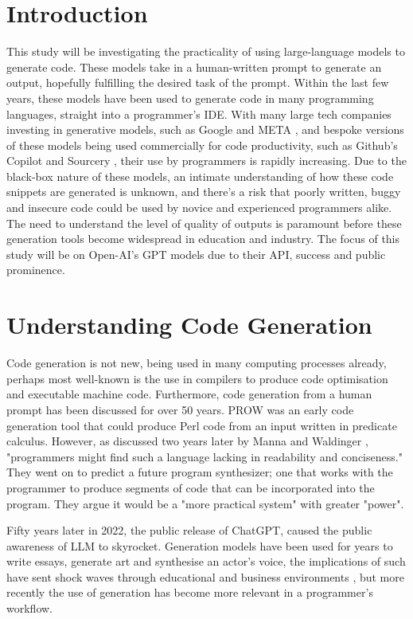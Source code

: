\documentclass[manuscript,screen,review,sigconf]{acmart}
\begin{document}
\section{Introduction}
This study will be investigating the practicality of using large-language models to generate code. These models take in a human-written prompt to generate an output, hopefully fulfilling the desired task of the prompt. Within the last few years, these models have been used to generate code in many programming languages, straight into a programmer's IDE. With many large tech companies investing in generative models, such as Google and META \cite{Google_AI_2023, Meta_2023}, and bespoke versions of these models being used commercially for code productivity, such as Github's Copilot and Sourcery \cite{GitHub_2021, Sourcery_2023}, their use by programmers is rapidly increasing. Due to the black-box nature of these models, an intimate understanding of how these code snippets are generated is unknown, and there's a risk that poorly written, buggy and insecure code could be used by novice and experienced programmers alike. The need to understand the level of quality of outputs is paramount before these generation tools become widespread in education and industry. The focus of this study will be on Open-AI's GPT models due to their API, success and public prominence.

\section{Understanding Code Generation}
Code generation is not new, being used in many computing processes already, perhaps most well-known is the use in compilers to produce code optimisation and executable machine code. Furthermore, code generation from a human prompt has been discussed for over 50 years. PROW \cite{PROW} was an early code generation tool that could produce Perl code from an input written in predicate calculus. However, as discussed two years later by Manna and Waldinger \cite{Program_Syn}, "programmers might find such a language lacking in readability and conciseness." They went on to predict a future program synthesizer; one that works with the programmer to produce segments of code that can be incorporated into the program. They argue it would be a "more practical system" with greater "power".

Fifty years later in 2022, the public release of ChatGPT\cite{ChatRel}, caused the public awareness of LLM  to skyrocket. Generation models have been used for years to write essays, generate art and synthesise an actor's voice, the implications of such have sent shock waves through educational and business environments \cite{GPTBusinessImpact, GPTEducationImpact, ethicalImpact, LaborMarketImpact}, but more recently the use of generation has become more relevant in a programmer's workflow.
\end{document}
